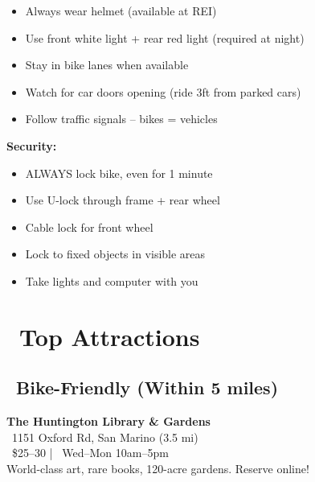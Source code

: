 \documentclass[10pt,letterpaper]{article}
\begin{document}
\begin{tipbox}[title=Safety First:]
\begin{small}
\begin{itemize}[leftmargin=0.2in,itemsep=1pt]
\item Always wear helmet (available at REI)
\item Use front white light + rear red light (required at night)
\item Stay in bike lanes when available
\item Watch for car doors opening (ride 3ft from parked cars)
\item Follow traffic signals -- bikes = vehicles
\end{itemize}

\textbf{Security:}
\begin{itemize}[leftmargin=0.2in,itemsep=1pt]
\item ALWAYS lock bike, even for 1 minute
\item Use U-lock through frame + rear wheel
\item Cable lock for front wheel
\item Lock to fixed objects in visible areas
\item Take lights and computer with you
\end{itemize}
\end{small}
\end{tipbox}

\newpage


\section*{\faStar\ Top Attractions}

\subsection*{\faBicycle\ Bike-Friendly (Within 5 miles)}

\begin{infobox}[colback=gray!10,colframe=gray]
\textbf{The Huntington Library \& Gardens}\\
\faMapMarker\ 1151 Oxford Rd, San Marino (3.5 mi)\\
\faDollarSign\ \$25--30 | \faClock\ Wed--Mon 10am--5pm\\
World-class art, rare books, 120-acre gardens. Reserve online!
\end{infobox}
\end{document}

